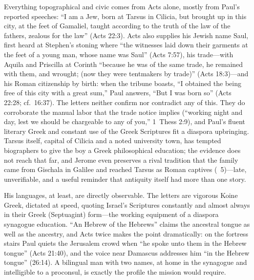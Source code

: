 Everything topographical and civic comes from Acts alone, mostly from
Paul's reported speeches: ``I am a Jew, born at Tarsus in Cilicia, but
brought up in this city, at the feet of Gamaliel, taught according to the
truth of the law of the fathers, zealous for the law'' (Acts 22:3). Acts
also supplies his Jewish name Saul, first heard at Stephen's stoning where
``the witnesses laid down their garments at the feet of a young man, whose
name was Saul'' (Acts 7:57), his trade---with Aquila and Priscilla at
Corinth ``because he was of the same trade, he remained with them, and
wrought; (now they were tentmakers by trade)'' (Acts 18:3)---and his Roman
citizenship by birth: when the tribune boasts, ``I obtained the being free
of this city with a great sum,'' Paul answers, ``But I was born so'' (Acts
22:28; cf.\ 16:37). The letters neither confirm nor contradict any of
this. They do corroborate the manual labor that the trade notice implies
(``working night and day, lest we should be chargeable to any of you,''
1~Thess 2:9), and Paul's fluent literary Greek and constant use of the
Greek Scriptures fit a diaspora upbringing. Tarsus itself, capital of
Cilicia and a noted university town, has tempted biographers to give the
boy a Greek philosophical education; the evidence does not reach that
far, and Jerome even preserves a rival tradition that the family came
from Gischala in Galilee and reached Tarsus as Roman captives
(~5)---late, unverifiable, and a useful
reminder that antiquity itself had more than one story.

His languages, at least, are directly observable. The letters are
vigorous Koine Greek, dictated at speed, quoting Israel's Scriptures
constantly and almost always in their Greek (Septuagint) form---the
working equipment of a diaspora synagogue education. ``An Hebrew of the
Hebrews'' claims the ancestral tongue as well as the ancestry, and Acts
twice makes the point dramatically: on the fortress stairs Paul quiets
the Jerusalem crowd when ``he spoke unto them in the Hebrew tongue''
(Acts 21:40), and the voice near Damascus addresses him ``in the Hebrew
tongue'' (26:14). A bilingual man with two names, at home in the
synagogue and intelligible to a proconsul, is exactly the profile the
mission would require.


